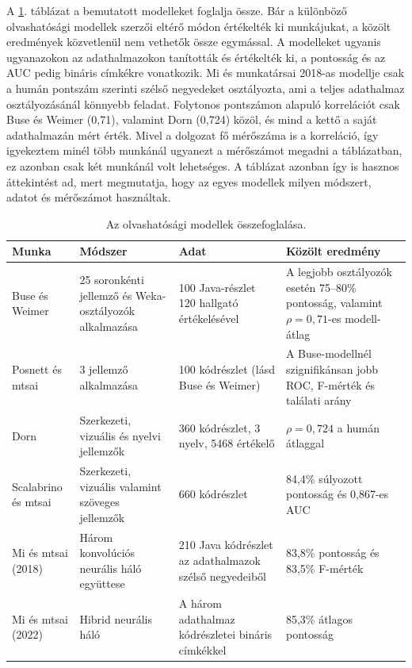 \documentclass[
]{elteikthesis}[2024/04/26]
\begin{document}
A \ref{tab:related:models}. táblázat a bemutatott modelleket foglalja össze. %
Bár a különböző olvashatósági modellek szerzői eltérő módon értékelték ki
munkájukat, a közölt eredmények közvetlenül nem vethetők össze egymással. A
modelleket ugyanis ugyanazokon az adathalmazokon tanították és értékelték ki, a
pontosság és az AUC pedig bináris címkékre vonatkozik. Mi és munkatársai 2018-as
modellje csak a humán pontszám szerinti szélső negyedeket osztályozta, ami a
teljes adathalmaz osztályozásánál könnyebb feladat. Folytonos pontszámon alapuló
korrelációt csak Buse és Weimer (0,71), valamint Dorn (0,724) közöl, és mind a
kettő a saját adathalmazán mért érték. Mivel a dolgozat fő mérőszáma is a
korreláció, így igyekeztem minél több munkánál ugyanezt a mérőszámot megadni a
táblázatban, ez azonban csak két munkánál volt lehetséges. A táblázat azonban
így is hasznos áttekintést ad, mert megmutatja, hogy az egyes modellek milyen
módszert, adatot és mérőszámot használtak.

\begin{table}[htb]
	\centering
	\small
	\begin{tabular}{ | p{} | p{} | p{} | p{} | }
		\hline
		\textbf{Munka} &
		\textbf{Módszer} &
		\textbf{Adat} &
		\textbf{Közölt eredmény} \\
		\hline \hline
		Buse és Weimer \cite{buse2008metric,buse2010learning} &
		25 soronkénti jellemző és Weka-osztályozók alkalmazása &
		100 Java-részlet 120 hallgató értékelésével &
		A legjobb osztályozók esetén 75--80\% pontosság, valamint $\rho = 0{,}71$-es modell-átlag \\
		\hline
		Posnett és mtsai \cite{posnett2011simpler} &
		3 jellemző alkalmazása &
		100 kódrészlet (lásd Buse és Weimer) &
		A Buse-modellnél szignifikánsan jobb ROC, F-mérték és találati arány \\
		\hline
		Dorn \cite{dorn2012general} &
		Szerkezeti, vizuális és nyelvi jellemzők &
		360 kódrészlet, 3 nyelv, 5468 értékelő &
		$\rho = 0{,}724$ a humán átlaggal \\
		\hline
		Scalabrino és mtsai \cite{scalabrino2018comprehensive} &
		Szerkezeti, vizuális valamint szöveges jellemzők &
		660 kódrészlet &
		84,4\% súlyozott pontosság és 0,867-es AUC \\
		\hline
		Mi és mtsai (2018) \cite{mi2018improving} &
		Három konvolúciós neurális háló együttese &
		210 Java kódrészlet az adathalmazok szélső negyedeiből &
		83,8\% pontosság és 83,5\% F-mérték \\
		\hline
		Mi és mtsai (2022) \cite{mi2022towards} &
		Hibrid neurális háló &
		A három adathalmaz kódrészletei bináris címkékkel &
		85,3\% átlagos pontosság \\
		\hline
	\end{tabular}
	\caption[Az olvashatósági modellek összefoglalása]{Az olvashatósági modellek összefoglalása.}
	\label{tab:related:models}
\end{table}
\end{document}
